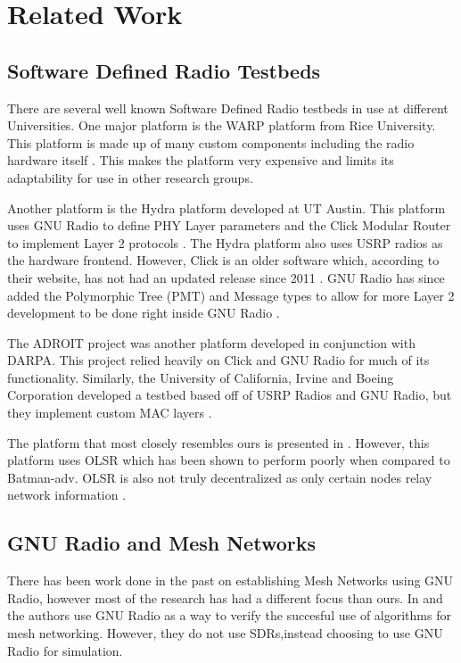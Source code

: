 \section{Related Work}

\subsection{Software Defined Radio Testbeds}

There are several well known Software Defined Radio testbeds in use at different Universities. One major platform is the WARP platform from Rice University. This platform is made up of many custom components including the radio hardware itself \cite{7071706}. This makes the platform very expensive and limits its adaptability for use in other research groups. 

Another platform is the Hydra platform developed at UT Austin. This platform uses GNU Radio to define PHY Layer parameters and the Click Modular Router to implement Layer 2 protocols \cite{4212821}. The Hydra platform also uses USRP radios as the hardware frontend. However, Click is an older software which, according to their website, has not had an updated release since 2011 \cite{citationNeeded}. GNU Radio has since added the Polymorphic Tree (PMT) and Message types to allow for more Layer 2 development to be done right inside GNU Radio \cite{citationneeded}. 

The ADROIT project was another platform developed in conjunction with DARPA. This project relied heavily on Click and GNU Radio for much of its functionality. \cite{4286321}  Similarly, the University of California, Irvine and Boeing Corporation developed a testbed based off of USRP Radios and GNU Radio, but they implement custom MAC layers \cite{4753441}. 

The platform that most closely resembles ours is presented in \cite{0002}. However, this platform uses OLSR which has been shown to perform poorly when compared to Batman-adv. OLSR is also not truly decentralized as only certain nodes relay network information \cite{5375690}. 

\subsection{GNU Radio and Mesh Networks}

There has been work done in the past on establishing Mesh Networks using GNU Radio, however most of the research has had a different focus than ours. In \cite{4509617} and \cite{5062250} the authors use GNU Radio as a way to verify the succesful use of algorithms for mesh networking. However, they do not use SDRs,instead choosing to use GNU Radio for simulation. 

